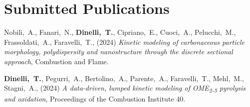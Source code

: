 \newif\ifshowpubsummary
\newif\ifshowsubmittedpubs
\showsubmittedpubstrue %
\newif\ifshowacceptedpubs

\newcommand{\arxiv}[1]{[\href{http://arxiv.org/abs/#1}{arXiv:#1}]}

\def\zero{0}
\def\one{1}
\newcommand{\citeCount}[1]{%
  \def\val{#1}
  \ifx\val\zero%
  \else%
    \ifx\val\one%
    (1~citation)%
    \else%
    (#1~citations)%
    \fi%
  \fi}

\setcounter{numPubs}{5}

\setcounter{pubCounter}{\value{numPubs}}


\ifshowpubsummary
\section{\sc Publication Summary}
   {\bf h-index ---}
   As of 20-02-2024: 1 (according to Google Scholar).

   {\bf Top five cited ---}
\else %
\fi

\renewcommand{\citeCount}[1]{}
\ifshowsubmittedpubs
\section{\sc Submitted Publications}
   \begin{etaremune}[start=\value{pubCounter}]
      \item
         Nobili,~A.,
         Fanari,~N.,
         {\bf Dinelli,~T.},
         Cipriano,~E.,
         Cuoci,~A.,
         Pelucchi,~M.,
         Frassoldati,~A.,
         Faravelli,~T.,
         (2024)
         {\it Kinetic modeling of carbonaceous particle morphology, polydispersity and
         nanostructure through the discrete sectional approach},
         {Combustion and Flame}.
      \item
         {\bf Dinelli,~T.},
         Pegurri,~A.,
         Bertolino,~A.,
         Parente,~A.,
         Faravelli,~T.,
         Mehl,~M.,
         Stagni,~A.,
         (2024)
         {\it A data-driven, lumped kinetic modeling of OME\textsubscript{2-5} pyrolysis and oxidation},
         {Proceedings of the Combustion Institute 40}.
   \end{etaremune}
\else %
\fi

